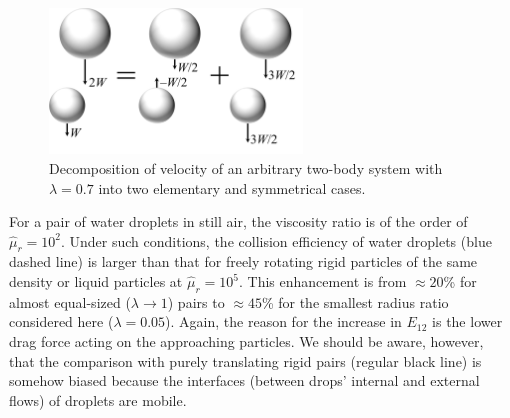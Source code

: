 \documentclass[../thesis.tex]{subfiles}
\begin{document}
\begin{figure}%
\center
\includegraphics[trim=00mm 10mm 05mm 00mm, clip, width=0.6\textwidth]{../figs/PRF/fig8.png}
\caption{Decomposition of velocity of an arbitrary two-body system with $\lambda=0.7$ into two elementary and symmetrical cases.}
\label{fig:decomp}
\end{figure}%
%
For a pair of water droplets in still air, the viscosity ratio is of the order of $\hat{\mu}_r = 10^2$. Under such conditions, the collision efficiency of water droplets (blue dashed line) is larger than that for freely rotating rigid particles of the same density or liquid particles at $\hat{\mu}_r = 10^5$. This enhancement is from $\approx20$\% for almost equal-sized ($\lambda\to1$) pairs to $\approx45$\% for the smallest radius ratio considered here ($\lambda=0.05$). Again, the reason for the increase in $E_{12}$ is the lower drag force acting on the approaching particles. We should be aware, however, that the comparison with purely translating rigid pairs (regular black line) is somehow biased because the interfaces (between drops' internal and external flows) of droplets are mobile.
\end{document}
